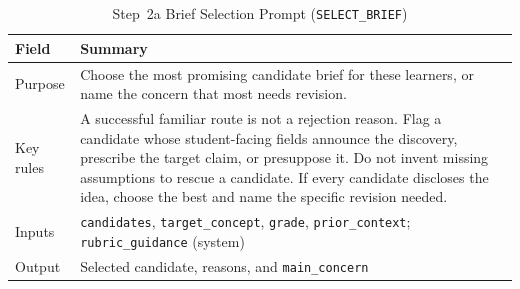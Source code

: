 \begin{table}[!htb]
\centering
\caption[Step 2a Brief Selection Prompt (\texttt{SELECT\_BRIEF})]{Step~2a Brief Selection Prompt (\texttt{SELECT\_BRIEF})}
\label{tab:app-structpf-2a-select}
\footnotesize
\setlength{\tabcolsep}{4.5pt}
\renewcommand{\arraystretch}{1.16}
\begin{tabular}{@{} >{\raggedright\arraybackslash}p{} >{\raggedright\arraybackslash}p{} @{}}
\toprule
\textbf{Field} & \textbf{Summary} \\
\midrule
Purpose & Choose the most promising candidate brief for these learners, or name the concern that most needs revision. \\
Key rules & A successful familiar route is not a rejection reason. \newline Flag a candidate whose student-facing fields announce the discovery, prescribe the target claim, or presuppose it. \newline Do not invent missing assumptions to rescue a candidate. \newline If every candidate discloses the idea, choose the best and name the specific revision needed. \\
Inputs & \texttt{candidates}, \texttt{target\_concept}, \texttt{grade}, \texttt{prior\_context}; \texttt{rubric\_guidance} (system) \\
Output & Selected candidate, reasons, and \texttt{main\_concern} \\
\bottomrule
\end{tabular}
\end{table}


